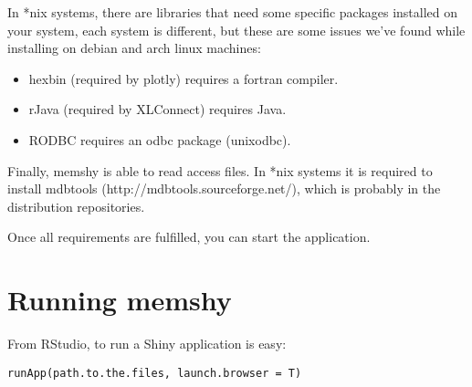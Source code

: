 \documentclass[10pt,a4paper]{memoir}
\begin{document}
In *nix systems, there are libraries that need some specific packages installed on your system, each system is different, but these are some issues we’ve found while installing on debian and arch linux machines:

\begin{itemize}
	\item hexbin (required by plotly) requires a fortran compiler.
	\item rJava (required by XLConnect) requires Java.
	\item RODBC requires an odbc package (unixodbc).
\end{itemize}

Finally, memshy is able to read access files. In *nix systems it is required to install mdbtools (http://mdbtools.sourceforge.net/), which is probably in the distribution repositories.

Once all requirements are fulfilled, you can start the application.

\chapter{Running memshy}

From RStudio, to run a Shiny application is easy:

\begin{lstlisting}
runApp(path.to.the.files, launch.browser = T)
\end{lstlisting}














\medskip
 


\end{document}
